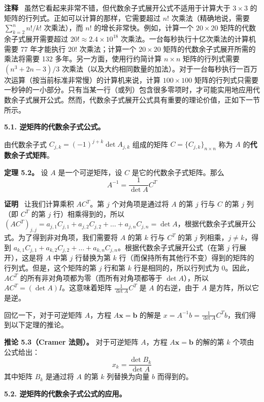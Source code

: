 \textbf{注释}~ 虽然它看起来非常不错，但代数余子式展开公式不适用于计算大于 $3 \times 3$ 的矩阵的行列式。正如可以计算的那样，它需要超过 $n!$ 次乘法（精确地说，需要 $\sum_{k=2}^n n!/k!$ 次乘法），而 $n!$ 的增长非常快。例如，计算一个 $20 \times 20$ 矩阵的代数余子式展开需要超过 $20! \approx 2.4 \times 10^{18}$ 次乘法。一台每秒执行十亿次乘法的计算机需要 77 年才能执行 $20!$ 次乘法；计算一个 $20 \times 20$ 矩阵的代数余子式展开所需的乘法将需要 132 多年。另一方面，使用行约简计算 $n \times n$ 矩阵的行列式需要 $(n^3 + 2n - 3) / 3$ 次乘法（以及大约相同数量的加法）。对于一台每秒执行一百万次运算（按当前标准非常慢）的计算机来说，计算 $100 \times 100$ 矩阵的行列式只需要一秒钟的一小部分。只有当某一行（或列）包含很多零项时，才可能实用地应用代数余子式展开公式。然而，代数余子式展开公式具有重要的理论价值，正如下一节所示。

\textbf{5.1. 逆矩阵的代数余子式公式。}

由代数余子式 $C_{j,k} = (-1)^{j+k} \det A_{j,k}$ 组成的矩阵 $C = \{C_{j,k}\}_{n \times n}$ 称为 $A$ 的\textbf{代数余子式矩阵}。

\textbf{定理 5.2。} 设 $A$ 是一个可逆矩阵，设 $C$ 是它的代数余子式矩阵。那么
$$
A^{-1} = \frac{1}{\det A} C^T
$$

\textbf{证明}~ 让我们计算乘积 $AC^T$。第 $j$ 个对角项是通过将 $A$ 的第 $j$ 行与 $C$ 的第 $j$ 列（即 $C^T$ 的第 $j$ 行）相乘得到的，所以 $(AC^T)_{j,j} = a_{j,1} C_{j,1} + a_{j,2} C_{j,2} + \dots + a_{j,n} C_{j,n} = \det A$，根据代数余子式展开公式。为了得到非对角项，我们需要将 $A$ 的第 $k$ 行与 $C^T$ 的第 $j$ 列相乘，$j \neq k$，得到 $a_{k,1} C_{j,1} + a_{k,2} C_{j,2} + \dots + a_{k,n} C_{j,n}$。根据代数余子式展开公式（在第 $j$ 行展开），这是将 $A$ 中第 $j$ 行替换为第 $k$ 行（而保持所有其他行不变）得到的矩阵的行列式。但是，这个矩阵的第 $j$ 行和第 $k$ 行是相同的，所以行列式为 0。因此，$AC^T$ 的所有非对角项都为零（而所有对角项都等于 $\det A$），所以 $AC^T = (\det A) I$。这意味着矩阵 $\frac{1}{\det A} C^T$ 是 $A$ 的右逆，由于 $A$ 是方阵，所以它是逆。

回忆一下，对于可逆矩阵 $A$，方程 $A \mathbf{x} = \mathbf{b}$ 的解是 $x = A^{-1} b = \frac{1}{\det A} C^T b$，我们得到以下定理的推论。

\textbf{推论 5.3（Cramer 法则）。} 对于可逆矩阵 $A$，方程 $A \mathbf{x} = \mathbf{b}$ 的解的第 $k$ 个项由公式给出：
$$
x_k = \frac{\det B_k}{\det A}
$$
其中矩阵 $B_k$ 是通过将 $A$ 的第 $k$ 列替换为向量 $b$ 而得到的。

\textbf{5.2. 逆矩阵的代数余子式公式的应用。}

